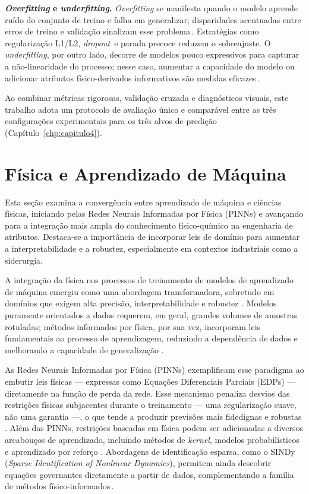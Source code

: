 \textbf{\textit{Overfitting} e \textit{underfitting}.}
\emph{Overfitting} se manifesta quando o modelo aprende ruído do conjunto de treino e falha em generalizar; disparidades acentuadas entre erros de treino e validação sinalizam esse problema\,\cite{goodfellow2016deep}. Estratégias como regularização L1/L2, \textit{dropout}\,\cite{srivastava2014dropout} e parada precoce reduzem o sobreajuste. O \emph{underfitting}, por outro lado, decorre de modelos pouco expressivos para capturar a não-linearidade do processo; nesse caso, aumentar a capacidade do modelo ou adicionar atributos físico-derivados informativos são medidas eficazes\,\cite{goodfellow2016deep}.

Ao combinar métricas rigorosas, validação cruzada e diagnósticos visuais, este trabalho adota um protocolo de avaliação único e comparável entre as três configurações experimentais para os três alvos de predição (Capítulo~\ref{chp:capitulo4}).

\section{Física e Aprendizado de Máquina}
\label{sec:des2}

Esta seção examina a convergência entre aprendizado de máquina e ciências físicas, iniciando pelas Redes Neurais Informadas por Física (PINNs) e avançando para a integração mais ampla do conhecimento físico-químico na engenharia de atributos. Destaca-se a importância de incorporar leis de domínio para aumentar a interpretabilidade e a robustez, especialmente em contextos industriais como a siderurgia.

A integração da física nos processos de treinamento de modelos de aprendizado de máquina emergiu como uma abordagem transformadora, sobretudo em domínios que exigem alta precisão, interpretabilidade e robustez \cite{cuomo2022physics,karniadakis2021physics}. Modelos puramente orientados a dados requerem, em geral, grandes volumes de amostras rotuladas; métodos informados por física, por sua vez, incorporam leis fundamentais ao processo de aprendizagem, reduzindo a dependência de dados e melhorando a capacidade de generalização \cite{raissi2019pinns,cuomo2022physics}.

As Redes Neurais Informadas por Física (PINNs) exemplificam esse paradigma ao embutir leis físicas — expressas como Equações Diferenciais Parciais (EDPs) — diretamente na função de perda da rede. Esse mecanismo penaliza desvios das restrições físicas subjacentes durante o treinamento — uma regularização suave, não uma garantia —, o que tende a produzir previsões mais fidedignas e robustas \cite{willard2020integrating,wang2021deep}. Além das PINNs, restrições baseadas em física podem ser adicionadas a diversos arcabouços de aprendizado, incluindo métodos de \textit{kernel}, modelos probabilísticos e aprendizado por reforço \cite{brunton2020machine}. Abordagens de identificação esparsa, como o SINDy (\textit{Sparse Identification of Nonlinear Dynamics}), permitem ainda descobrir equações governantes diretamente a partir de dados, complementando a família de métodos físico-informados\,\cite{brunton2016sindy}.

